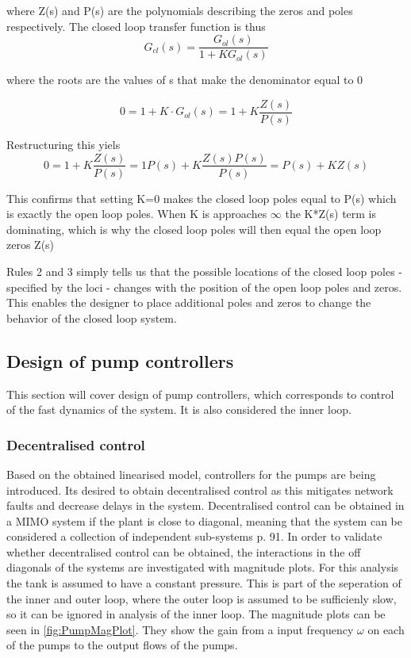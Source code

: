 where Z(s) and P(s) are the polynomials describing the zeros and poles respectively.
The closed loop transfer function is thus
\begin{equation}
	G_{cl}(s) = \frac{G_{ol}(s)}{1 + K G_{ol}(s)}
\end{equation}

where the roots are the values of s that make the denominator equal to 0

\begin{equation}
	0 = 1 + K \cdot G_{ol}(s) = 1 + K \frac{Z(s)}{P(s)}
\end{equation}

Restructuring this yiels
\begin{equation}
	0 = 1 + K \frac{Z(s)}{P(s)} = 1P(s) + K \frac{Z(s) P(s)}{P(s)} = P(s) + K Z(s)
\end{equation}

This confirms that setting K=0 makes the closed loop poles equal to P(s) which is exactly the open loop poles. When K is approaches $\infty$ the K*Z(s) term is dominating, which is why the closed loop poles will then equal the open loop zeros Z(s)

Rules 2 and 3 simply tells us that the possible locations of the closed loop poles - specified by the loci - changes with the position of the open loop poles and zeros. This enables the designer to place additional poles and zeros to change the behavior of the closed loop system. 


\subsection{Design of pump controllers}
This section will cover design of pump controllers, which corresponds to control of the fast dynamics of the system. It is also considered the inner loop. 
\subsubsection{Decentralised control}
Based on the obtained linearised model, controllers for the pumps are being introduced. Its desired to obtain decentralised control as this mitigates network faults and decrease delays in the system. Decentralised control can be obtained in a MIMO system if the plant is close to diagonal, meaning that the system can be considered a collection of independent sub-systems \cite{Skogestad2005} p. 91. 
In order to validate whether decentralised control can be obtained, the interactions in the off diagonals of the systems are investigated with magnitude plots. For this analysis the tank is assumed to have a constant pressure. This is part of the seperation of the inner and outer loop, where the outer loop is assumed to be sufficienly slow, so it can be ignored in analysis of the inner loop. The magnitude plots can be seen in \cref{fig:PumpMagPlot}. They show the gain from a input frequency $\omega$ on each of the pumps to the output flows of the pumps.

